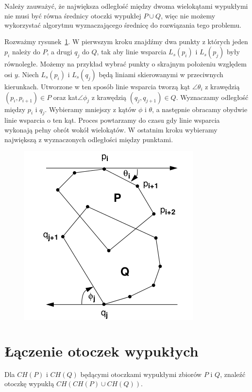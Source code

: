 Należy zauważyć, że największa odległość między dwoma wielokątami
wypukłymi nie musi być równa średnicy otoczki wypukłej $P \cup Q$,
więc nie możemy wykorzystać algorytmu wyznaczającego średnicę do
rozwiązania tego problemu.

Rozważmy rysunek~\ref{img:calipers3}. W pierwszym kroku znajdźmy dwa
punkty z których jeden $p_i$ należy do $P$, a drugi $q_j$ do $Q$, tak
aby linie wsparcia $L_s(p_i)$ i $L_s(p_j)$ były równoległe. Możemy na
przykład wybrać punkty o skrajnym położeniu względem osi $y$. Niech
$L_s(p_i)$ i $L_s(q_j)$ będą liniami skierowanymi w przeciwnych
kierunkach. Utworzone w ten sposób linie wsparcia tworzą kąt
$\angle{\theta_i}$ z krawędzią $(p_i, p_{i+1}) \in P$ oraz
kat$\angle{\phi_j}$ z krawędzią $(q_j, q_{j+1}) \in Q$. Wyznaczamy
odległość między $p_i$ i $q_j$. Wybieramy mniejszy z kątów $\phi$ i
$\theta$, a następnie obracamy obydwie linie wsparcia o ten
kąt. Proces powtarzamy do czasu gdy linie wsparcia wykonają pełny
obrót wokół wielokątów. W ostatnim kroku wybieramy największą z
wyznaczonych odległości między punktami.

\begin{figure}[htb]
  \centering
  \includegraphics[scale=0.5]{img/calipers3}
  \caption{\label{img:calipers3}}
\end{figure}

\section{Łączenie otoczek wypukłych}
\begin{problem}
  Dla $CH(P)$ i $CH(Q)$ będącymi otoczkami wypukłymi zbiorów $P$ i
  $Q$, znaleźć otoczkę wypukłą $CH(CH(P) \cup CH(Q))$.
\end{problem}

